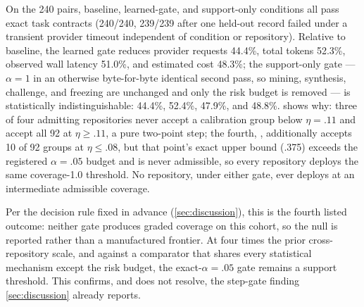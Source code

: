 \begin{table}[t]
  \centering
  \caption{Disaggregated outcomes for the gate-frontier study. ``Nonzero
  coverage in sweep'' lists every coverage value the frozen $\Lambda$ grid
  produces for the learned gate before threshold selection; ``Admitted''
  is the value actually deployed. Support-only ($\alpha=1$) produces the
  identical sweep and admission on every repository.}
  \label{tab:gate-frontier-disaggregated}
  \footnotesize
  \setlength{\tabcolsep}{3pt}
  
\end{table}

On the 240 pairs, baseline, learned-gate, and support-only conditions all
pass exact task contracts (240/240, 239/239 after one held-out record failed
under a transient provider timeout independent of condition or repository).
Relative to baseline, the learned gate reduces provider requests 44.4\%,
total tokens 52.3\%, observed wall latency 51.0\%, and estimated cost 48.3\%;
the support-only gate --- $\alpha=1$ in an otherwise byte-for-byte identical
second  pass, so mining, synthesis, challenge, and
freezing are unchanged and only the risk budget is removed --- is
statistically indistinguishable: 44.4\%, 52.4\%, 47.9\%, and 48.8\%.
 shows why: three of four admitting
repositories never accept a calibration group below $\eta=.11$ and accept
all 92 at $\eta\ge.11$, a pure two-point step; the fourth,
, additionally accepts 10 of 92 groups at
$\eta\le.08$, but that point's exact upper bound (.375) exceeds the
registered $\alpha=.05$ budget and is never admissible, so every repository
deploys the same coverage-1.0 threshold. No repository, under either gate,
ever deploys at an intermediate admissible coverage.

Per the decision rule fixed in advance (\cref{sec:discussion}), this is the
fourth listed outcome: neither gate produces graded coverage on this cohort,
so the null is reported rather than a manufactured frontier. At four times
the prior cross-repository scale, and against a comparator that shares every
statistical mechanism except the risk budget, the exact-$\alpha=.05$ gate
remains a support threshold. This confirms, and does not resolve, the
step-gate finding \cref{sec:discussion} already reports.

